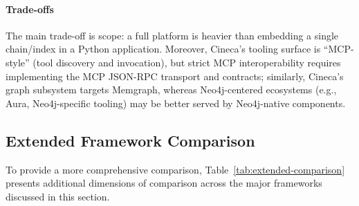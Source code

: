 \paragraph{Trade-offs}
The main trade-off is scope: a full platform is heavier than embedding a single chain/index in a Python application.
Moreover, Cineca's tooling surface is ``MCP-style'' (tool discovery and invocation), but strict MCP interoperability
requires implementing the MCP JSON-RPC transport and contracts; similarly, Cineca's graph subsystem targets Memgraph,
whereas Neo4j-centered ecosystems (e.g., Aura, Neo4j-specific tooling) may be better served by Neo4j-native components.

\subsection{Extended Framework Comparison}

To provide a more comprehensive comparison, Table~\ref{tab:extended-comparison} presents additional dimensions of comparison across the major frameworks discussed in this section.

\begin{table}[ht]
\centering
\caption{Extended comparison of agent orchestration frameworks across production readiness dimensions.}
\label{tab:extended-comparison}
\small
\setlength{\tabcolsep}{3pt}
\renewcommand{\arraystretch}{1.15}
\vspace{2mm}
\caption*{Legend: Y = yes (built-in/strong), P = partial/community support, N = not available.}
\end{table}

